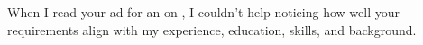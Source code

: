 When I read your ad for an  on , I couldn't help noticing how well your requirements align with my experience, education, skills, and background.